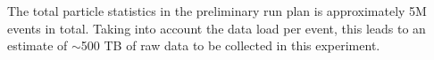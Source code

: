%
%
%
%
%



The total particle statistics in the preliminary run plan
 is approximately 5M events in total.  Taking into account the data load per event,
this leads to an estimate of $\sim$500 TB of raw data to be collected in this experiment. 

